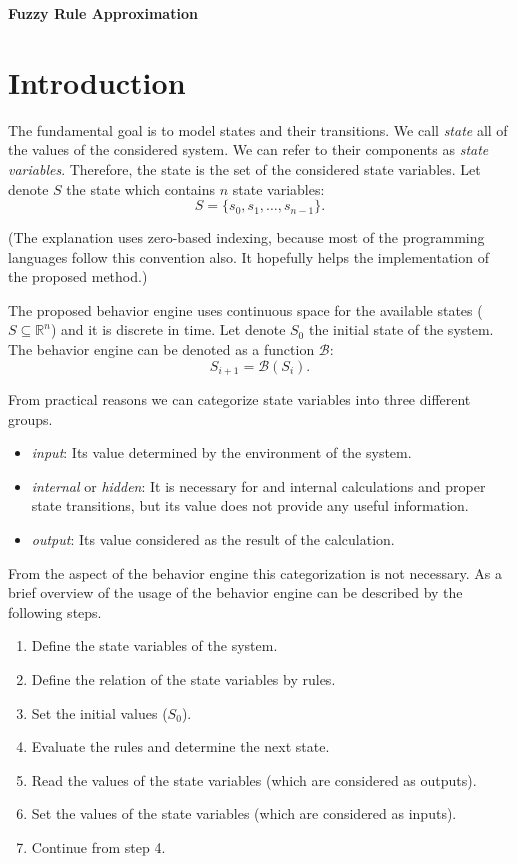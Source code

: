 \documentclass[a4paper,12pt]{article}
\begin{document}
\begin{center}
    \Large \textbf{Fuzzy Rule Approximation}
\end{center}

\section{Introduction}

The fundamental goal is to model states and their transitions.
We call \textit{state} all of the values of the considered system.
We can refer to their components as \textit{state variables}.
Therefore, the state is the set of the considered state variables.
Let denote $S$ the state which contains $n$ state variables:
\[
S = \{s_0, s_1, \ldots, s_{n-1}\}.
\]

(The explanation uses zero-based indexing, because most of the programming languages follow this convention also. It hopefully helps the implementation of the proposed method.)

The proposed behavior engine uses continuous space for the available states ($S \subseteq \mathbb{R}^n$) and it is discrete in time.
Let denote $S_0$ the initial state of the system.
The behavior engine can be denoted as a function $\mathcal{B}$:
\[S_{i+1} = \mathcal{B}(S_i).\]

From practical reasons we can categorize state variables into three different groups.
\begin{itemize}
    \item \textit{input}: Its value determined by the environment of the system.
    \item \textit{internal} or \textit{hidden}: It is necessary for and internal calculations and proper state transitions, but its value does not provide any useful information.
    \item \textit{output}: Its value considered as the result of the calculation.
\end{itemize}

From the aspect of the behavior engine this categorization is not necessary.
As a brief overview of the usage of the behavior engine can be described by the following steps.
\begin{enumerate}
    \item Define the state variables of the system.
    \item Define the relation of the state variables by rules.
    \item Set the initial values ($S_0$).
    \item Evaluate the rules and determine the next state.
    \item Read the values of the state variables (which are considered as outputs).
    \item Set the values of the state variables (which are considered as inputs).
    \item Continue from step 4.
\end{enumerate}
\end{document}
